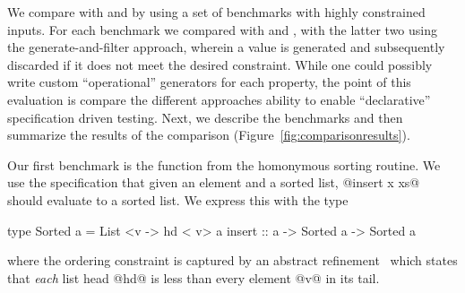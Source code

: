 We compare \toolname with \quickcheck and \smallcheck by using 
a set of benchmarks with highly constrained inputs. 
%
For each benchmark we compared \toolname with \smallcheck and
\quickcheck, with the latter two using the generate-and-filter 
approach, wherein a value is generated and subsequently discarded if
it does not meet the desired constraint.
%
While one could possibly write custom ``operational'' generators 
for each property, the point of this evaluation is compare the 
different approaches ability to enable ``declarative'' specification 
driven testing.
%
Next, we describe the benchmarks and then summarize the results of the comparison
(Figure~\ref{fig:comparisonresults}).



%
Our first benchmark is the \Insert function from the homonymous 
sorting routine. We use the specification that given an element 
and a sorted list, @insert x xs@ should evaluate to a sorted list.
We express this with the type
%
\begin{code}
  type Sorted a = List <{\hd v -> hd < v}> a
  insert :: a -> Sorted a -> Sorted a
\end{code}
%
where the ordering constraint is captured by an abstract 
refinement~\cite{Vazou13} which states that \emph{each} 
list head @hd@ is less than every element @v@ in its tail.

